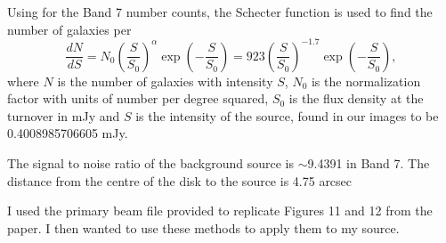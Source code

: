 
Using \cite{GC_Number_Counts} for the Band 7 number counts, the Schecter function is used to find the number of galaxies per 
\begin{equation}
\frac{dN}{dS}= N_0 \left(\frac{S}{S_0}\right)^\alpha \exp \left(- \frac{S}{S_0}\right)
= 923\left(\frac{S}{S_0}\right)^{-1.7} \exp \left(- \frac{S}{S_0}\right),
\label{eq: GC_Schecter}
\end{equation}
\noindent where $N$ is the number of galaxies with intensity $S$, $N_0$ is the normalization factor with units of number per degree squared, $S_0$ is the flux density at the turnover in mJy and $S$ is the intensity of the source, found in our images to be 0.4008985706605 mJy. 


The signal to noise ratio of the background source is $\sim$9.4391 in Band 7. The distance from the centre of the disk to the source is 4.75 arcsec





I used the primary beam file provided to replicate Figures 11 and 12 from the paper. I then wanted to use these methods to apply them to my source. 






